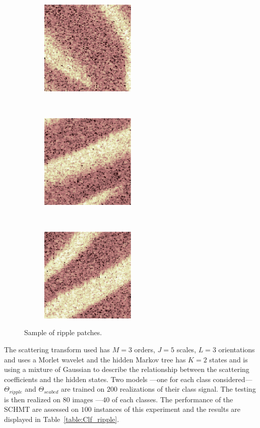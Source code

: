 \documentclass[a4paper,11pt]{report}
\begin{document}
		
		\begin{figure}[h]
			\centering
			\begin{subfigure}[t]{0.3\textwidth}
				\centering
				\includegraphics[height=1.8in]{patch_ripple_1.eps}
			\end{subfigure}%
			~ 
			\begin{subfigure}[t]{0.3\textwidth}
        \centering
        \includegraphics[height=1.8in]{patch_ripple_2.eps}
			\end{subfigure}
			~
			\begin{subfigure}[t]{0.3\textwidth}
        \centering
        \includegraphics[height=1.8in]{patch_ripple_3.eps}
			\end{subfigure}
			\caption{Sample of ripple patches.}
			\label{fig:Ripple patch}
		\end{figure}
		
		The scattering transform used has $M=3$ orders, $J=5$ scales, $L=3$ orientations and uses a Morlet wavelet and the hidden Markov tree has $K=2$ states and is using a mixture of Gaussian to describe the relationship between the scattering coefficients and the hidden states. Two models ---one for each class considered--- $\Theta_{ripple}$ and $\Theta_{seabed}$ are trained on $200$ realizations of their class signal. The testing is then realized on $80$ images ---$40$ of each classes. The performance of the SCHMT are assessed on $100$ instances of this experiment and the results are displayed in Table~\ref{table:Clf_ripple}.\\
		
\end{document}
